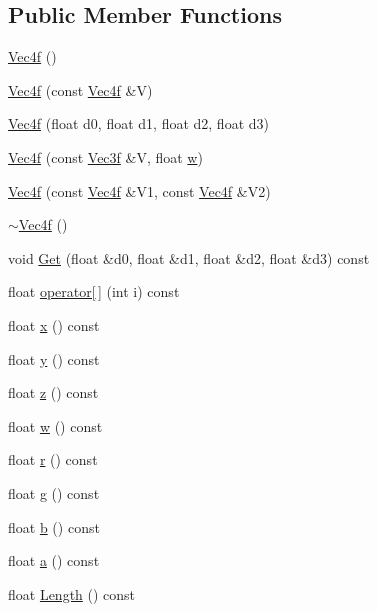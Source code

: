 \subsection*{Public Member Functions}
\begin{DoxyCompactItemize}
\item 
\hyperlink{classVec4f_a5124dad37f3bd310a11bb1592b1456d4}{Vec4f} ()
\item 
\hyperlink{classVec4f_acada261ab1deeff0aecb2b717300cecc}{Vec4f} (const \hyperlink{classVec4f}{Vec4f} \&V)
\item 
\hyperlink{classVec4f_a2d79033898fd342979f9da1f5a318a5a}{Vec4f} (float d0, float d1, float d2, float d3)
\item 
\hyperlink{classVec4f_af93eaed53706e0c147c49846a43cbf5e}{Vec4f} (const \hyperlink{classVec3f}{Vec3f} \&V, float \hyperlink{classVec4f_a50fc37943df263c5c656aa0707b4b5ef}{w})
\item 
\hyperlink{classVec4f_aeb03d44ccc6993f691d4750abcf742a6}{Vec4f} (const \hyperlink{classVec4f}{Vec4f} \&V1, const \hyperlink{classVec4f}{Vec4f} \&V2)
\item 
\hyperlink{classVec4f_a06896138c29aefaa63f86ede0b851f88}{$\sim$\+Vec4f} ()
\item 
void \hyperlink{classVec4f_ac50e2b42ece0ea38319a1da0e35f2901}{Get} (float \&d0, float \&d1, float \&d2, float \&d3) const 
\item 
float \hyperlink{classVec4f_a642f9dd8ba277449ad7e0adc758c75a8}{operator\mbox{[}$\,$\mbox{]}} (int i) const 
\item 
float \hyperlink{classVec4f_a25f2284456fd28a42c0b4e385f968a17}{x} () const 
\item 
float \hyperlink{classVec4f_a2ee69c55784c64a50cc2e0c5eaa974d7}{y} () const 
\item 
float \hyperlink{classVec4f_a810931422b57413fe997648b7b3af01d}{z} () const 
\item 
float \hyperlink{classVec4f_a50fc37943df263c5c656aa0707b4b5ef}{w} () const 
\item 
float \hyperlink{classVec4f_afac8aafe64ff4b5f30c67dd885a912f9}{r} () const 
\item 
float \hyperlink{classVec4f_ac761cb0275da3e8309fa1ea2aa97211f}{g} () const 
\item 
float \hyperlink{classVec4f_a68a0e7c40d2a9a761de53041aad8c577}{b} () const 
\item 
float \hyperlink{classVec4f_af12a900ddc3e3eeb9bbe10d721392f4a}{a} () const 
\item 
float \hyperlink{classVec4f_a374d8d253020a8db79de8a19b0bcfb21}{Length} () const 

\end{DoxyCompactItemize}
